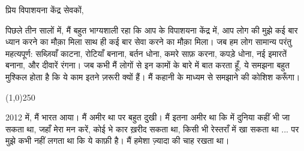 \documentclass{article}
\begin{document}
प्रिय विपाशयना केंद्र सेवकों,

पिछले तीन सालों में, मैं बहुत भाग्यशाली रहा कि आप के विपाशयना केंद्र में, आप लोग की मुझे कई बार ध्यान करने का मौक़ा मिला साथ
ही कई बार सेवा करने का मौक़ा मिला। जब हम लोग सामान्य परंतु महत्यपूर्ण: सब्ज़ियाँ काटना, रोटियाँ
बनाना, बर्तन धोना, कमरे साफ़ करना, कपड़े धोना, नई इमारतें बनाना, और दीवारें रंगना। जब कभी मैं
लोगों से इन कामों के बारे में बात करता हूँ, ये समझना बहुत मुश्किल होता है कि ये काम इतने ज़रूरी क्यों हैं।
मैं कहानी के माध्यम से समझाने की कोशिश करूँगा।


\begin{center}
\line(1,0){250}
\end{center}

2012 में, मैं भारत आया। मैं अमीर था पर बहुत दुखी। मैं इतना अमीर था कि में दुनिया कहीं भी जा सकता
था, जहाँ मेरा मन करें, कोई भे कार ख़रीद सकता था, किसी भी रेस्तराँ में खा सकता था ... पर मुझे कभी
नहीं लगता था कि ये काफ़ी है। मैं हमेशा ज़्यादा की चाह रखता था।
\end{document}
